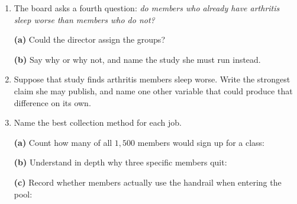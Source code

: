 \documentclass[10pt]{article}
\begin{document}
\boxguard
\begin{tcolorbox}[colback=white, colframe=black!40, breakable,
    title=\textbf{Tier E --- Extension},
    fonttitle=\bfseries, arc=2mm, left=3mm, right=3mm, top=1.5mm, bottom=1.5mm]
\small
\begin{enumerate}[leftmargin=1.6em, itemsep=4pt, topsep=3pt]

  \item The board asks a fourth question: \emph{do members who already have
        arthritis sleep worse than members who do not?}

        \textbf{(a)} Could the director assign the groups? 

        \textbf{(b)} Say why or why not, and name the study she must run
        instead.

  \item Suppose that study finds arthritis members sleep worse. Write the
        strongest claim she may publish, and name one other variable that could
        produce that difference on its own.

  \item Name the best collection method for each job.

        \textbf{(a)} Count how many of all $1{,}500$ members would sign up for a
        class: 

        \textbf{(b)} Understand in depth why three specific members quit:

        \textbf{(c)} Record whether members actually use the handrail when
        entering the pool: 
\end{enumerate}
\end{tcolorbox}
\end{document}
